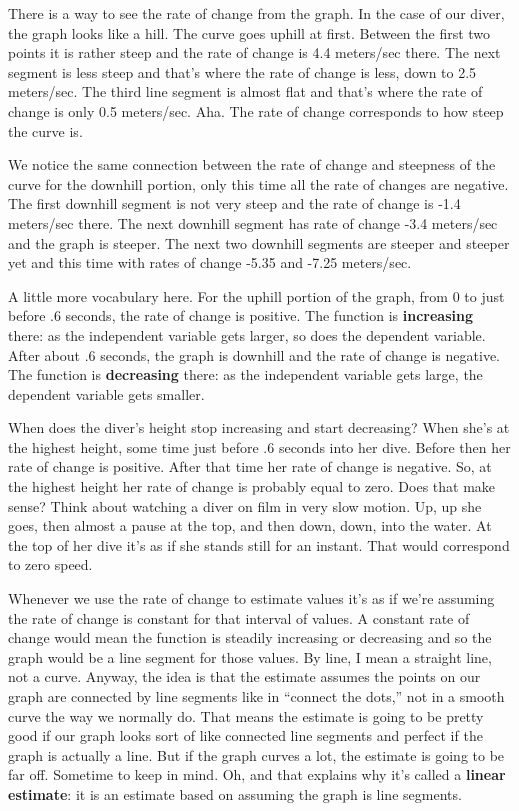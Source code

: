 There is a way to see the rate of change from the graph.  In the case of our diver, the graph looks like a hill.  The curve goes uphill at first.  Between the first two points it is rather  steep and the rate of change is 4.4 meters/sec there.  The next segment is less steep and that's where the rate of change is less, down to 2.5 meters/sec.  The third line segment is almost flat and that's where the rate of change is only 0.5 meters/sec.  Aha.  The rate of change corresponds to how steep the curve is. 

We notice the same connection between the rate of change and steepness of the curve for the downhill portion, only this time all the rate of changes are negative.  The first downhill segment is not very steep and the rate of change is -1.4 meters/sec there.  The next downhill segment has rate of change -3.4 meters/sec and the graph is steeper.  The next two downhill segments are steeper and steeper yet and this time with rates of change -5.35 and -7.25 meters/sec.

A little more vocabulary here.  For the uphill portion of the graph, from 0 to just before .6 seconds, the rate of change is positive.  The function is \textbf{increasing} there:  as the independent variable gets larger, so does the dependent variable. After about .6 seconds, the graph is downhill and the rate of change is negative.  The function is  \textbf{decreasing} there:  as the independent variable gets large, the dependent variable gets smaller.

When does the diver's height stop increasing and start decreasing?  When she's at the highest height, some time just before .6 seconds into her dive.  Before then her rate of change is positive.  After that time her rate of change is negative.  So, at the highest height her rate of change is probably equal to zero.  Does that make sense?  Think about watching a diver on film in very slow motion.  Up, up she goes, then almost a pause at the top, and then down, down, into the water.  At the top of her dive it's as if she stands still for an instant.  That would correspond to zero speed.

Whenever we use the rate of change to estimate values it's as if we're assuming the rate of change is constant for that interval of values.  A constant rate of change would mean the function is steadily increasing or decreasing and so the graph would be a line segment for those values.  By line, I mean a straight line, not a curve.  Anyway, the idea is that the estimate assumes the points on our graph are connected by line segments like in ``connect the dots,'' not in a smooth curve the way we normally do.  That means the estimate is going to be pretty good if our graph looks sort of like connected line segments and perfect if the graph is actually a line.  But if the graph curves a lot, the estimate is going to be far off.  Sometime to keep in mind.  Oh, and that explains why it's called a \textbf{linear estimate}:  it is an estimate based on assuming the graph is line segments.

